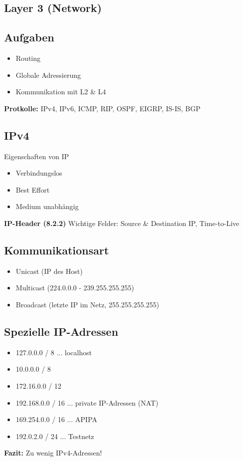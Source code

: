 \subsection{Layer 3 (Network)}
\subsection*{Aufgaben}
\begin{itemize}
	\item Routing
	\item Globale Adressierung
	\item Kommunikation mit L2 \& L4
\end{itemize}
\textbf{Protkolle:} IPv4, IPv6, ICMP, RIP, OSPF, EIGRP, IS-IS, BGP

\subsection*{IPv4}
Eigenschaften von IP
\begin{itemize}
	\item Verbindungslos
	\item Best Effort
	\item Medium unabhängig
\end{itemize}
\textbf{IP-Header (8.2.2)}
Wichtige Felder: Source \& Destination IP, Time-to-Live

\subsection*{Kommunikationsart}
\begin{itemize}
	\item Unicast (IP des Host)
	\item Multicast (224.0.0.0 - 239.255.255.255)
	\item Broadcast (letzte IP im Netz, 255.255.255.255)
\end{itemize}

\subsection*{Spezielle IP-Adressen}
\begin{itemize}
	\item 127.0.0.0 / 8 ... localhost
	\item 10.0.0.0 / 8
	\item[] 172.16.0.0 / 12
	\item[] 192.168.0.0 / 16 ... private IP-Adressen (NAT)
	\item 169.254.0.0 / 16 ... APIPA
	\item 192.0.2.0 / 24 ... Testnetz
\end{itemize}
\textbf{Fazit:} Zu wenig IPv4-Adressen!

